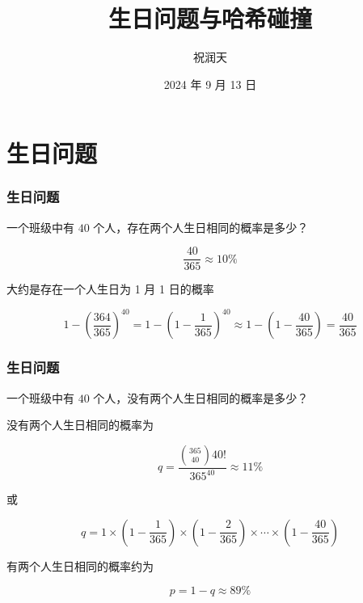\documentclass{beamer}
\title{生日问题与哈希碰撞}
\author{祝润天}
\institute{复旦大学计算机科学技术学院}
\date{2024 年 9 月 13 日}
\begin{document}
\begin{frame}
    
    \maketitle

\end{frame}

\section{生日问题}

\begin{frame}
    \frametitle{生日问题}

    \begin{problem}
        一个班级中有 $40$ 个人，存在两个人生日相同的概率是多少？
    \end{problem}

    \pause

    \[\frac{40}{365}\approx 10\%\]

    \begin{center}
        大约是存在一个人生日为 1 月 1 日的概率
    \end{center}

    \[1 - (\frac{364}{365})^{40} = 1 - (1 - \frac{1}{365})^{40} \approx 1 - (1 - \frac{40}{365}) = \frac{40}{365}\]

\end{frame}

\begin{frame}
    \frametitle{生日问题}

    \begin{problem}
        一个班级中有 $40$ 个人，没有两个人生日相同的概率是多少？
    \end{problem}
    
    没有两个人生日相同的概率为

    \[q = \frac{{365 \choose 40} 40!}{365^{40}}\approx 11\%\]

    或

    \[q = 1 \times (1 - \frac{1}{365}) \times (1 - \frac{2}{365}) \times \cdots \times (1 - \frac{40}{365})\]

    有两个人生日相同的概率约为

    \[p = 1 - q \approx 89\%\]

\end{frame}
\end{document}
